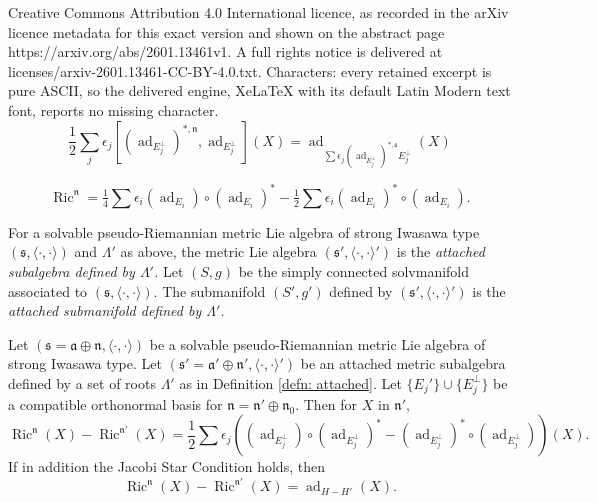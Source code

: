 \documentclass[10pt,a4paper]{amsart}
\newcommand\ad{\operatorname{ad}}
\newcommand\ip{{\langle\cdot {,} \cdot\rangle}}
\newcommand\n{{\mathfrak{n}}}
\newcommand\s{{\mathfrak{s}}}
\newcommand{\Ric}{\operatorname{Ric}}
\newcommand{\fraka}{\ensuremath{\mathfrak{a}} }
\newcommand{\frakn}{\ensuremath{\mathfrak{n}} }
\newcommand{\fraks}{\ensuremath{\mathfrak{s}} }
\newcommand{\smallfrac}[2]{\textstyle{\frac{#1}{#2}}  }
\renewcommand\a{{\mathfrak{a}}}
\begin{document}
Creative Commons Attribution 4.0 International licence, as recorded in the arXiv licence metadata for this exact version and shown on the abstract page https://arxiv.org/abs/2601.13461v1. A full rights notice is delivered at licenses/arxiv-2601.13461-CC-BY-4.0.txt. Characters: every retained excerpt is pure ASCII, so the delivered engine, XeLaTeX with its default Latin Modern text font, reports no missing character.
\begin{equation}\label{eq:jacobi-star}
\smallfrac{1}{2} \sum _j \epsilon_j  [(\ad_{E_j^\perp})^{\ast, \frakn} ,
\ad_{E_j^\perp}
]
(X) =
\ad_{ \sum  \epsilon_j (\ad_{E_j^\perp})^{\ast, \fraks} E_j^\perp} (X) \end{equation}

 \begin{equation}\label{eqn: ricci-nilpotent}\Ric^{\n} = \tfrac 14 \sum \epsilon_i (\ad_{E_i}) \circ (\ad_{E_i})^* - \tfrac 12 \sum \epsilon_i (\ad_{E_i})^* \circ (\ad_{E_i}).\end{equation}

\begin{definition}\label{defn: attached} 
For a solvable pseudo-Riemannian metric  Lie algebra of strong Iwasawa 
type $(\s, \ip)$ and $\Lambda'$ as above,  the metric Lie algebra 
$(\s', \ip')$ is  the {\em attached subalgebra defined by $\Lambda'$.}  
Let $(S,g)$ be the simply connected  solvmanifold  associated to 
$(\s, \ip)$.  The submanifold $(S',g')$ defined by $(\s', \ip')$ is 
the {\em attached submanifold defined by $\Lambda'$. } 
\end{definition}

\begin{theorem}\label{thm: ricci-n-diff} 
   Let $(\fraks = \a \oplus \n,\ip)$ be a solvable  pseudo-Riemannian metric Lie algebra
   of strong Iwasawa type. 
   Let $(\fraks'= \fraka' \oplus \frakn', \ip')$ be an attached metric subalgebra defined by a set of roots $\Lambda'$
   as in Definition \ref{defn: attached}.
   Let $\{E_j'\} \cup \{E^\perp_j\}$ be a compatible orthonormal basis for $\n = \n' \oplus \n_0$.
   Then for $X$ in $\n',$  
   \[ \Ric^\n (X)  - \Ric^{\n'} (X)   = {\smallfrac{1}{2}} 
 \sum  \epsilon_j \left(  (\ad_{E_j^\perp}) \circ  (\ad_{E_j^\perp})^* -   (\ad_{E_j^\perp})^* \circ  (\ad_{E_j^\perp}) \right) (X).  
\]
 If in addition the Jacobi Star Condition holds, then
\[ \Ric^{\n} (X) - \Ric^{\n'} (X)  =  \ad_{H-H'}(X). 
\]
\end{theorem}
\end{document}

